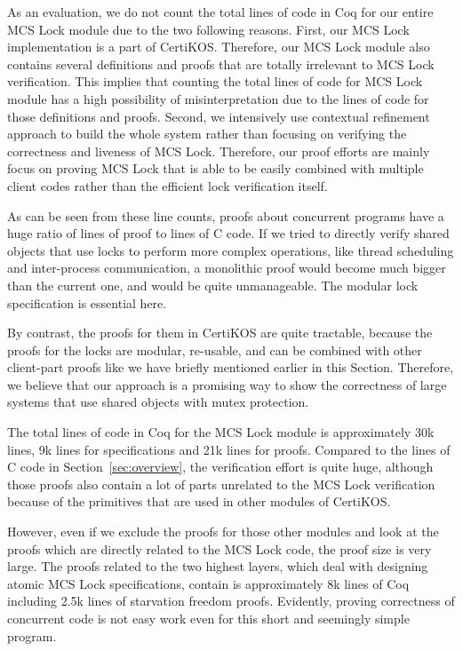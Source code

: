 As an evaluation, we do not count the total lines of code in Coq for our entire 
MCS Lock module due to the two following reasons. First, our MCS Lock implementation 
is a part of CertiKOS. Therefore, our MCS Lock module also contains several definitions 
and proofs that are totally irrelevant to MCS Lock verification. 
This implies that counting the total lines of code for MCS Lock module has a 
high possibility of misinterpretation due to the lines of code for those definitions and proofs.
Second, we intensively use contextual refinement approach to 
build the whole system rather than focusing on verifying the correctness and 
liveness of MCS Lock. Therefore, our proof efforts are mainly focus on proving 
MCS Lock that is able to be easily combined with multiple client codes 
rather than the efficient lock verification itself.  

As can be seen from these line counts, proofs about concurrent programs
have a huge ratio of lines of proof to lines of C code.
If we tried to directly verify shared objects that use locks to 
perform more complex operations, like thread scheduling
and inter-process communication, a monolithic proof  
would become much bigger than the current one, and would be quite
unmanageable. The modular lock specification is essential here.


By contrast, the proofs for them in CertiKOS are quite tractable, 
because the proofs for the locks are modular, re-usable, and can 
be combined with other client-part proofs like we have briefly 
mentioned earlier in this Section.
Therefore, we believe that our approach is a promising way to 
show the correctness of large systems that use shared objects with mutex protection. 


The total lines of code in Coq for the MCS Lock module is approximately 30k lines, 9k lines for specifications and 21k lines for proofs.
Compared to the lines of C code in Section~\ref{sec:overview}, the verification effort is quite huge, although
those proofs also contain a lot of parts unrelated to the MCS Lock verification because of the primitives that are used in other modules of CertiKOS.

However, even if we exclude the proofs for those other modules and look at the proofs which are directly related to the MCS Lock code, the proof size is very large.
The proofs related to the two highest layers, which deal with designing atomic MCS Lock specifications, contain is approximately 8k lines of Coq including 2.5k lines of starvation freedom proofs.
Evidently, proving correctness of concurrent code is not easy work even for this short and seemingly simple program.

